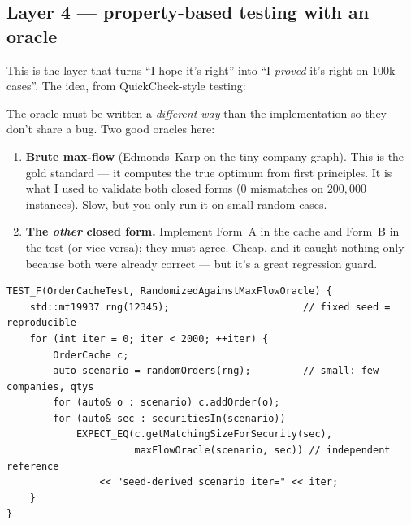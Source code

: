 \subsection{Layer 4 --- property-based testing with an oracle}

This is the layer that turns ``I hope it's right'' into ``I \emph{proved} it's
right on 100k cases''. The idea, from QuickCheck-style testing:

\begin{center}
\end{center}

The oracle must be written a \emph{different way} than the implementation so they
don't share a bug. Two good oracles here:

\begin{enumerate}[leftmargin=1.5em]
  \item \textbf{Brute max-flow} (Edmonds--Karp on the tiny company graph). This is
        the gold standard --- it computes the true optimum from first principles.
        It is what I used to validate both closed forms (0 mismatches on
        $200{,}000$ instances). Slow, but you only run it on small random cases.
  \item \textbf{The \emph{other} closed form.} Implement Form~A in the cache and
        Form~B in the test (or vice-versa); they must agree. Cheap, and it caught
        nothing only because both were already correct --- but it's a great
        regression guard.
\end{enumerate}

\begin{lstlisting}
TEST_F(OrderCacheTest, RandomizedAgainstMaxFlowOracle) {
    std::mt19937 rng(12345);                       // fixed seed = reproducible
    for (int iter = 0; iter < 2000; ++iter) {
        OrderCache c;
        auto scenario = randomOrders(rng);         // small: few companies, qtys
        for (auto& o : scenario) c.addOrder(o);
        for (auto& sec : securitiesIn(scenario))
            EXPECT_EQ(c.getMatchingSizeForSecurity(sec),
                      maxFlowOracle(scenario, sec)) // independent reference
                << "seed-derived scenario iter=" << iter;
    }
}
\end{lstlisting}

